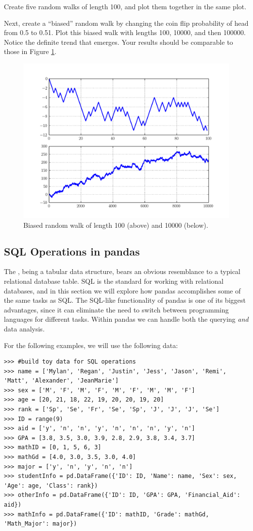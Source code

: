 \begin{problem}
Create five random walks of length 100, and plot them together in the same plot.

Next, create a ``biased'' random walk by changing the coin flip probability of head from 0.5 to 0.51.
Plot this biased walk with lengths 100, 10000, and then 100000. Notice the definite trend that emerges.
Your results should be comparable to those in Figure \ref{pandas:biasedRandomWalk}.
\end{problem}

\begin{figure}
\centering
\includegraphics[width=.7 \textwidth]{biasedRandomWalk.pdf}
\caption{Biased random walk of length 100 (above) and 10000 (below).}
\label{pandas:biasedRandomWalk}
\end{figure}

\subsection*{SQL Operations in pandas}
The , being a tabular data structure, bears an obvious resemblance to a typical relational
database table. SQL is the standard for working with relational databases, and in this section we will
explore how pandas accomplishes some of the same tasks as SQL. The SQL-like functionality of pandas is
one of its biggest advantages, since it can eliminate the need to switch between programming languages
for different tasks. Within pandas we can handle both the querying \emph{and} data analysis.

For the following examples, we will use the following data:
\begin{lstlisting}
>>> #build toy data for SQL operations
>>> name = ['Mylan', 'Regan', 'Justin', 'Jess', 'Jason', 'Remi', 'Matt', 'Alexander', 'JeanMarie']
>>> sex = ['M', 'F', 'M', 'F', 'M', 'F', 'M', 'M', 'F']
>>> age = [20, 21, 18, 22, 19, 20, 20, 19, 20]
>>> rank = ['Sp', 'Se', 'Fr', 'Se', 'Sp', 'J', 'J', 'J', 'Se']
>>> ID = range(9)
>>> aid = ['y', 'n', 'n', 'y', 'n', 'n', 'n', 'y', 'n']
>>> GPA = [3.8, 3.5, 3.0, 3.9, 2.8, 2.9, 3.8, 3.4, 3.7]
>>> mathID = [0, 1, 5, 6, 3]
>>> mathGd = [4.0, 3.0, 3.5, 3.0, 4.0]
>>> major = ['y', 'n', 'y', 'n', 'n']
>>> studentInfo = pd.DataFrame({'ID': ID, 'Name': name, 'Sex': sex, 'Age': age, 'Class': rank})
>>> otherInfo = pd.DataFrame({'ID': ID, 'GPA': GPA, 'Financial_Aid': aid})
>>> mathInfo = pd.DataFrame({'ID': mathID, 'Grade': mathGd, 'Math_Major': major})
\end{lstlisting}

